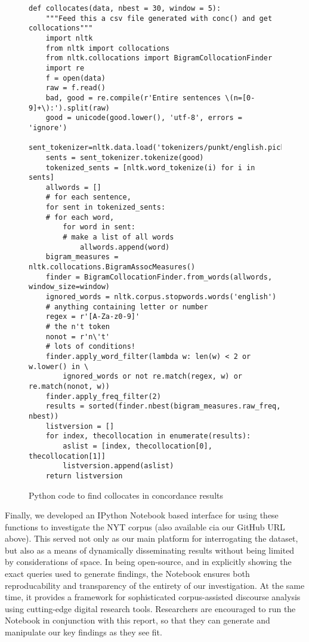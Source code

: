 \begin{figure}
\centering
\begin{minipage}[c]{.75\textwidth}
\centering
\begin{verbatim}
def collocates(data, nbest = 30, window = 5):
    """Feed this a csv file generated with conc() and get collocations"""
    import nltk
    from nltk import collocations
    from nltk.collocations import BigramCollocationFinder
    import re
    f = open(data)
    raw = f.read()
    bad, good = re.compile(r'Entire sentences \(n=[0-9]+\):').split(raw)
    good = unicode(good.lower(), 'utf-8', errors = 'ignore')
    sent_tokenizer=nltk.data.load('tokenizers/punkt/english.pickle')
    sents = sent_tokenizer.tokenize(good)
    tokenized_sents = [nltk.word_tokenize(i) for i in sents]
    allwords = []
    # for each sentence,
    for sent in tokenized_sents:
    # for each word,
        for word in sent:
        # make a list of all words
            allwords.append(word)
    bigram_measures = nltk.collocations.BigramAssocMeasures()
    finder = BigramCollocationFinder.from_words(allwords, window_size=window)
    ignored_words = nltk.corpus.stopwords.words('english')
    # anything containing letter or number
    regex = r'[A-Za-z0-9]'
    # the n't token
    nonot = r'n\'t'
    # lots of conditions!
    finder.apply_word_filter(lambda w: len(w) < 2 or w.lower() in \
        ignored_words or not re.match(regex, w) or re.match(nonot, w))
    finder.apply_freq_filter(2)
    results = sorted(finder.nbest(bigram_measures.raw_freq, nbest))
    listversion = []
    for index, thecollocation in enumerate(results):
        aslist = [index, thecollocation[0], thecollocation[1]]
        listversion.append(aslist)
    return listversion
\end{verbatim}
\caption{Python code to find collocates in concordance results}
\label{fig:code}
\end{minipage}
\end{figure}


Finally, we developed an IPython Notebook based interface for using these functions to investigate the NYT corpus (also available cia our GitHub URL above). This served not only as our main platform for interrogating the dataset, but also as a means of dynamically disseminating results without being limited by considerations of space. In being open-source, and in explicitly showing the exact queries used to generate findings, the Notebook ensures both reproducability and transparency of the entirety of our investigation. At the same time, it provides a framework for sophisticated corpus-assisted discourse analysis using cutting-edge digital research tools. Researchers are encouraged to run the Notebook in conjunction with this report, so that they can generate and manipulate our key findings as they see fit.


